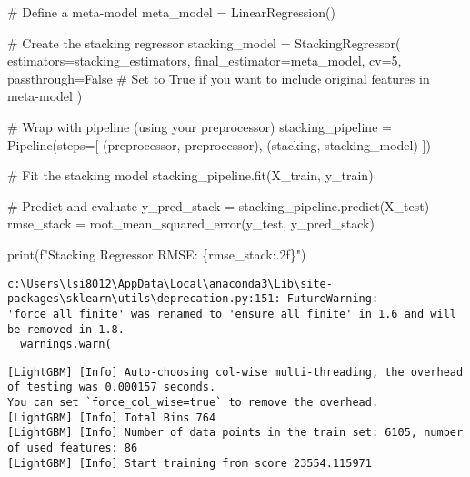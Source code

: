 \documentclass[
  letterpaper,
  DIV=11,
  numbers=noendperiod]{scrreprt}
\newenvironment{Shaded}{\begin{snugshade}}{\end{snugshade}}
\newcommand{\BuiltInTok}[1]{\textcolor[rgb]{0.00,0.23,0.31}{#1}}
\newcommand{\CommentTok}[1]{\textcolor[rgb]{0.37,0.37,0.37}{#1}}
\newcommand{\DecValTok}[1]{\textcolor[rgb]{0.68,0.00,0.00}{#1}}
\newcommand{\NormalTok}[1]{\textcolor[rgb]{0.00,0.23,0.31}{#1}}
\newcommand{\OperatorTok}[1]{\textcolor[rgb]{0.37,0.37,0.37}{#1}}
\newcommand{\SpecialCharTok}[1]{\textcolor[rgb]{0.37,0.37,0.37}{#1}}
\newcommand{\SpecialStringTok}[1]{\textcolor[rgb]{0.13,0.47,0.30}{#1}}
\newcommand{\StringTok}[1]{\textcolor[rgb]{0.13,0.47,0.30}{#1}}
\newcommand{\VariableTok}[1]{\textcolor[rgb]{0.07,0.07,0.07}{#1}}
\begin{document}
\begin{Shaded}
\begin{Highlighting}[]
\CommentTok{\# Define a meta{-}model}
\NormalTok{meta\_model }\OperatorTok{=}\NormalTok{ LinearRegression()}

\CommentTok{\# Create the stacking regressor}
\NormalTok{stacking\_model }\OperatorTok{=}\NormalTok{ StackingRegressor(}
\NormalTok{    estimators}\OperatorTok{=}\NormalTok{stacking\_estimators,}
\NormalTok{    final\_estimator}\OperatorTok{=}\NormalTok{meta\_model,}
\NormalTok{    cv}\OperatorTok{=}\DecValTok{5}\NormalTok{,}
\NormalTok{    passthrough}\OperatorTok{=}\VariableTok{False}  \CommentTok{\# Set to True if you want to include original features in meta{-}model}
\NormalTok{)}

\CommentTok{\# Wrap with pipeline (using your preprocessor)}
\NormalTok{stacking\_pipeline }\OperatorTok{=}\NormalTok{ Pipeline(steps}\OperatorTok{=}\NormalTok{[}
\NormalTok{    (}\StringTok{\textquotesingle{}preprocessor\textquotesingle{}}\NormalTok{, preprocessor),}
\NormalTok{    (}\StringTok{\textquotesingle{}stacking\textquotesingle{}}\NormalTok{, stacking\_model)}
\NormalTok{])}

\CommentTok{\# Fit the stacking model}
\NormalTok{stacking\_pipeline.fit(X\_train, y\_train)}

\CommentTok{\# Predict and evaluate}
\NormalTok{y\_pred\_stack }\OperatorTok{=}\NormalTok{ stacking\_pipeline.predict(X\_test)}
\NormalTok{rmse\_stack }\OperatorTok{=}\NormalTok{ root\_mean\_squared\_error(y\_test, y\_pred\_stack)}

\BuiltInTok{print}\NormalTok{(}\SpecialStringTok{f"Stacking Regressor RMSE: }\SpecialCharTok{\{}\NormalTok{rmse\_stack}\SpecialCharTok{:.2f\}}\SpecialStringTok{"}\NormalTok{)}
\end{Highlighting}
\end{Shaded}

\begin{verbatim}
c:\Users\lsi8012\AppData\Local\anaconda3\Lib\site-packages\sklearn\utils\deprecation.py:151: FutureWarning: 'force_all_finite' was renamed to 'ensure_all_finite' in 1.6 and will be removed in 1.8.
  warnings.warn(
\end{verbatim}

\begin{verbatim}
[LightGBM] [Info] Auto-choosing col-wise multi-threading, the overhead of testing was 0.000157 seconds.
You can set `force_col_wise=true` to remove the overhead.
[LightGBM] [Info] Total Bins 764
[LightGBM] [Info] Number of data points in the train set: 6105, number of used features: 86
[LightGBM] [Info] Start training from score 23554.115971
\end{verbatim}
\end{document}
